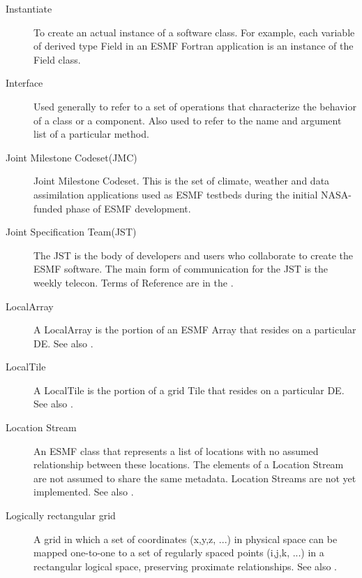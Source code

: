 \begin{description}
\label{glos:Instantiate}
\item[Instantiate] 
  To create an actual instance of a software class.  For example, each 
  variable of derived type Field in an ESMF Fortran application is an 
  instance of the Field class.

\label{glos:Interface}
\item[Interface] 
  Used generally to refer to a set of operations that characterize 
  the behavior of a class or a component.  Also used to refer to the
  name and argument list of a particular method.

\label{glos:JMC} 
\item[Joint Milestone Codeset(JMC)] 
  Joint Milestone Codeset.  This is the set of climate, weather and
  data assimilation applications used as ESMF testbeds 
  during the initial NASA-funded phase of ESMF development.

\label{glos:JST}
\item[Joint Specification Team(JST)]
  The JST is the body of developers and users who collaborate
  to create the ESMF software.  The main form of communication for 
  the JST is the weekly telecon.  Terms of Reference are in the .

\label{glos:LocalArray}
\item[LocalArray]
  A LocalArray is the portion of an ESMF Array that resides on a 
  particular DE.  See also .

\label{glos:LocalTile}
\item[LocalTile]
  A LocalTile is the portion of a grid Tile that resides on a 
  particular DE.  See also .

\label{glos:LocStream} 
\item[Location Stream] 
  An ESMF class that represents
  a list of locations with no assumed relationship between these locations.  
  The elements of a Location Stream are not assumed to share the same 
  metadata. Location Streams are not yet implemented.
  See also .

\label{glos:RecGrid} 
\item[Logically rectangular grid] 
  A grid in which a set of coordinates (x,y,z, ...) in physical
  space can be mapped one-to-one to a set of regularly spaced 
  points (i,j,k, ...) in a rectangular logical space, preserving
  proximate relationships.  See also .


\end{description}

